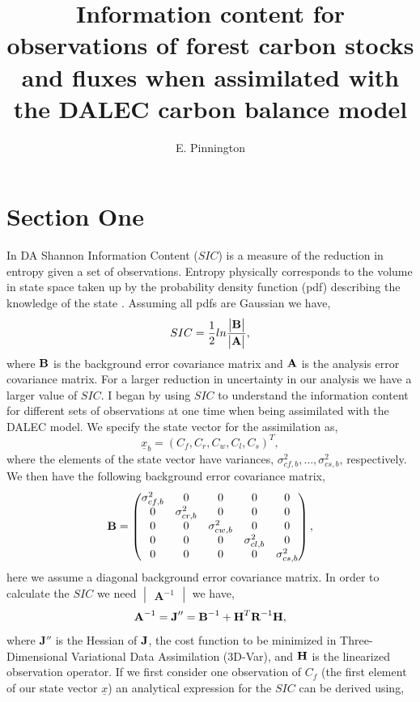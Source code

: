 \documentclass[11pt]{article}
\title{Information content for observations of forest carbon stocks and fluxes when assimilated with the DALEC carbon balance model}
\author{\normalsize{E. Pinnington}}
\begin{document}
\maketitle

\section*{Section One}

In DA Shannon Information Content ($SIC$) is a measure of the reduction in entropy given a set of observations. Entropy physically corresponds to the volume in state space taken up by the probability density function (pdf) describing the knowledge of the state \cite{rodgers2000inverse}. Assuming all pdfs are Gaussian we have,
\[
SIC=\frac{1}{2}ln\frac{\begin{vmatrix} \bf{B} \end{vmatrix}}{\begin{vmatrix} \bf{A} \end{vmatrix}},
\]
where $\bf{B}$ is the background error covariance matrix and $\bf{A}$ is the analysis error covariance matrix. For a larger reduction in uncertainty in our analysis we have a larger value of $SIC$. I began by using $SIC$ to understand the information content for different sets of observations at one time when being assimilated with the DALEC model. We specify the state vector for the assimilation as,
\[ \underline{x}_b = (C_f, C_r, C_w, C_l, C_s)^T, \] 
where the elements of the state vector have variances, $\sigma_{cf,b}^{2},\ldots,\sigma_{cs,b}^{2}$, respectively. We then have the following background error covariance matrix,
\[
\bf{B} = \begin{pmatrix} 
\sigma_{cf,b}^{2} & 0 & 0 & 0 & 0 \\
0 & \sigma_{cr,b}^{2} & 0 & 0 & 0 \\
0 & 0 & \sigma_{cw,b}^{2} & 0 & 0 \\
0 & 0 & 0 & \sigma_{cl,b}^{2} & 0 \\
0 & 0 & 0 & 0 & \sigma_{cs,b}^{2} \\
\end{pmatrix},
\]  
here we assume a diagonal background error covariance matrix. In order to calculate the $SIC$ we need $\begin{vmatrix} \textbf{A}^{-1} \end{vmatrix}$ we have,
\[
\textbf{A}^{-1}=\textbf{J}'' = \textbf{B}^{-1}+\textbf{H}^{T}\textbf{R}^{-1}\bf{H}, 
\]
where $\textbf{J}''$ is the Hessian of $\bf{J}$, the cost function to be minimized in Three-Dimensional Variational Data Assimilation (3D-Var), and $\bf{H}$ is the linearized observation operator. If we first consider one observation of $C_f$ (the first element of our state vector $\underline{x}$) an analytical expression for the $SIC$ can be derived using,
\end{document}
